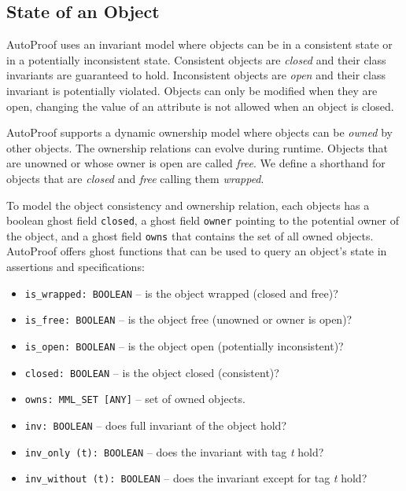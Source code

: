 \documentclass[a4paper,12pt]{article}
\newcommand{\AutoProof}{Auto\-Proof\xspace}
\newcommand{\e}[1]{\mbox{\lstinline[language=Eiffel]|#1|}}
\begin{document}
\subsection{State of an Object}

\AutoProof uses an invariant model where objects can be in a consistent state or in a potentially inconsistent state. Consistent objects are \emph{closed} and their class invariants are guaranteed to hold. Inconsistent objects are \emph{open} and their class invariant is potentially violated. Objects can only be modified when they are open, changing the value of an attribute is not allowed when an object is closed.

\AutoProof supports a dynamic ownership model where objects can be \emph{owned} by other objects. The ownership relations can evolve during runtime. Objects that are unowned or whose owner is open are called \emph{free}. We define a shorthand for objects that are \emph{closed} and \emph{free} calling them \emph{wrapped}.

To model the object consistency and ownership relation, each objects has a boolean ghost field \e{closed}, a ghost field \e{owner} pointing to the potential owner of the object, and a ghost field \e{owns} that contains the set of all owned objects. \AutoProof offers ghost functions that can be used to query an object's state in assertions and specifications:

\begin{itemize}
\item \e{is_wrapped: BOOLEAN} -- is the object wrapped (closed and free)?
\item \e{is_free: BOOLEAN} -- is the object free (unowned or owner is open)?
\item \e{is_open: BOOLEAN}  -- is the object open (potentially inconsistent)?
\item \e{closed: BOOLEAN} -- is the object closed (consistent)?
\item \e{owns: MML_SET [ANY]} -- set of owned objects.
\item \e{inv: BOOLEAN} -- does full invariant of the object hold?
\item \e{inv_only (t): BOOLEAN} -- does the invariant with tag \emph{t} hold?
\item \e{inv_without (t): BOOLEAN} -- does the invariant except for tag \emph{t} hold?
\end{itemize}
\end{document}
